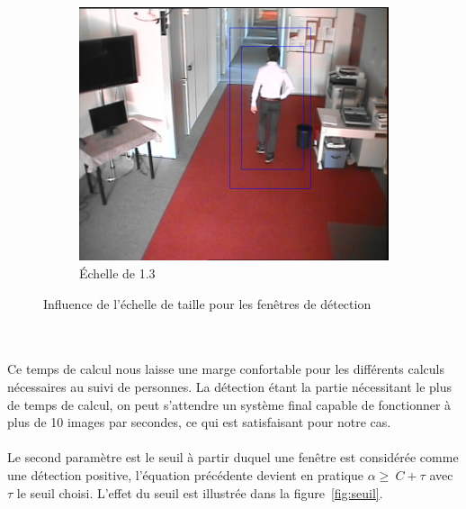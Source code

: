 \documentclass[12pt]{article}
\begin{document}
\begin{figure}[!ht]
	\begin{subfigure}{.25\textwidth}
		\centering
		\includegraphics[clip=true,trim=300 100 150 0,width=\linewidth]{img/multiscale13.png}
		\caption{Échelle de 1.3}
	\end{subfigure}
	\caption{Influence de l'échelle de taille pour les fenêtres de détection}
	\label{fig:multiscale}
\end{figure}\\
\\
Ce temps de calcul nous laisse une marge confortable pour les différents calculs nécessaires au suivi de personnes. La détection étant la partie nécessitant le plus de temps de calcul, on peut s'attendre un système final capable de fonctionner à plus de 10 images par secondes, ce qui est satisfaisant pour notre cas.\\
\\
Le second paramètre est le seuil à partir duquel une fenêtre est considérée comme une détection positive, l'équation précédente devient en pratique $\alpha\geq~C+\tau$ avec $\tau$ le seuil choisi. L'effet du seuil est illustrée dans la figure~\ref{fig:seuil}.
\end{document}
